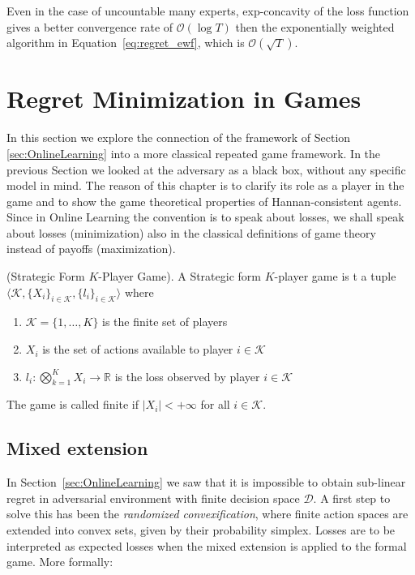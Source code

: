 Even in the case of uncountable many experts, exp-concavity of the loss function gives a better convergence rate of $\mathcal O(\log T)$ then the exponentially weighted algorithm in Equation~\eqref{eq:regret_ewf}, which is $\mathcal O(\sqrt T)$.

\section{Regret Minimization in Games}
\label{sec:GT}
In this section we explore the connection of the framework of Section \ref{sec:OnlineLearning} into a more classical repeated game framework. In the previous Section we looked at the adversary as a black box, without any specific model in mind. The reason of this chapter is to clarify its role as a player in the game and to show the game theoretical properties of Hannan-consistent agents. Since in Online Learning the convention is to speak about losses, we shall speak about losses (minimization) also in the classical definitions of game theory instead of payoffs (maximization).

\begin{definition}(Strategic Form $K$-Player Game).\label{def:Game}
    A Strategic form $K$-player game is t a tuple $\langle\mathcal K,\{X_i\}_{i\in\mathcal K},\{l_i\}_{i\in\mathcal K}\rangle$ where
    \begin{enumerate}
        \item $\mathcal K=\{1,\ldots,K\}$ is the finite set of players
        \item $X_i$ is the set of actions available to player $i\in\mathcal K$
        \item $l_i:\bigotimes\limits_{k=1}^KX_i\to\mathbb R$ is the loss observed by player $i\in\mathcal K$
    \end{enumerate}
	The game is called finite if $|X_i|<+\infty$ for all $i\in\mathcal K$.
\end{definition}


\subsection{Mixed extension}\label{sec:mixed}
In Section~\ref{sec:OnlineLearning} we saw that it is impossible to obtain sub-linear regret in adversarial environment with finite decision space $\mathcal D$. A first step to solve this has been the \emph{randomized convexification}, where finite action spaces are extended into convex sets, given by their probability simplex. Losses are to be interpreted as expected losses when the mixed extension is applied to the formal game. More formally: 

